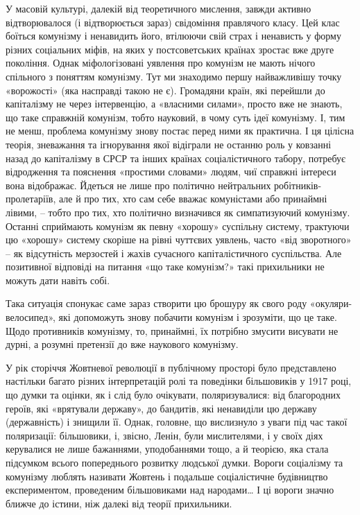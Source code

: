 \documentclass[12pt,a4paper,openany]{book}
\begin{document}
У масовій культурі, далекій від теоретичного мислення, завжди активно відтворювалося (і відтворюється зараз) свідоміння правлячого класу. Цей клас боїться комунізму і ненавидить його, втілюючи свій страх і ненависть у форму різних соціальних міфів, на яких у постсоветських країнах зростає вже друге покоління. Однак міфологізовані уявлення про комунізм не мають нічого спільного з поняттям комунізму. Тут ми знаходимо першу найважливішу точку «ворожості» (яка насправді такою не є). Громадяни країн, які перейшли до капіталізму не через інтервенцію, а «власними силами», просто вже не знають, що таке справжній комунізм, тобто науковий, в чому суть ідеї комунізму. І, тим не менш, проблема комунізму знову постає перед ними як практична. І ця цілісна теорія, зневажання та ігнорування якої відіграли не останню роль у ковзанні назад до капіталізму в СРСР та інших країнах соціалістичного табору, потребує відродження та пояснення «простими словами» людям, чиї справжні інтереси вона відображає. Йдеться не лише про політично нейтральних робітників-пролетаріїв, але й про тих, хто сам себе вважає комуністами або принаймні лівими, – тобто про тих, хто політично визначився як симпатизуючий комунізму. Останні сприймають комунізм як певну «хорошу» суспільну систему, трактуючи цю «хорошу» систему скоріше на рівні чуттєвих уявлень, часто «від зворотного» – як відсутність мерзостей і жахів сучасного капіталістичного суспільства. Але позитивної відповіді на питання «що таке комунізм?» такі прихильники не можуть дати навіть собі.

Така ситуація спонукає саме зараз створити цю брошуру як свого роду «окуляри-велосипед», які допоможуть знову побачити комунізм і зрозуміти, що це таке. Щодо противників комунізму, то, принаймні, їх потрібно змусити висувати не дурні, а розумні претензії до вже наукового комунізму.

У рік сторіччя Жовтневої революції в публічному просторі було представлено настільки багато різних інтерпретацій ролі та поведінки більшовиків у 1917 році, що думки та оцінки, як і слід було очікувати, поляризувалися: від благородних героїв, які «врятували державу», до бандитів, які ненавиділи цю державу (державність) і знищили її. Однак, головне, що вислизнуло з уваги під час такої поляризації: більшовики, і, звісно, Ленін, були мислителями, і у своїх діях керувалися не лише бажаннями, уподобаннями тощо, а й теорією, яка стала підсумком всього попереднього розвитку людської думки. Вороги соціалізму та комунізму люблять називати Жовтень і подальше соціалістичне будівництво експериментом, проведеним більшовиками над народами… І ці вороги значно ближче до істини, ніж далекі від теорії прихильники.
\end{document}
